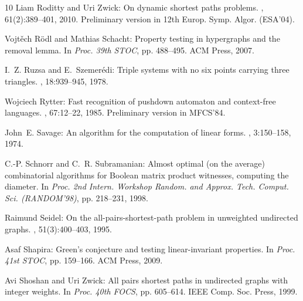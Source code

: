 \begin{thebibliography}{10}
{\sc Liam Roditty and Uri Zwick}: On dynamic shortest paths problems.
, 61(2):389--401, 2010.
\newblock Preliminary version in 12th Europ. Symp. Algor. (ESA'04).
\newblock [\epfmtdoi{10.1007/s00453-010-9401-5}]

{\sc Vojt{\v e}ch R{\"o}dl and Mathias Schacht}: Property testing in
  hypergraphs and the removal lemma.
\newblock In {\em Proc. 39th STOC}, pp. 488--495. ACM Press, 2007.
\newblock [\epfmtdoi{10.1145/1250790.1250862}]

{\sc I.~Z. Ruzsa and E.~Szemer\'{e}di}: Triple systems with no six points
  carrying three triangles.
, 18:939--945,
  1978.

{\sc Wojciech Rytter}: Fast recognition of pushdown automaton and context-free
  languages.
, 67:12--22, 1985.
\newblock Preliminary version in MFCS'84.
\newblock [\epfmtdoi{10.1016/S0019-9958(85)80024-3}]

{\sc John~E. Savage}: An algorithm for the computation of linear forms.
, 3:150--158, 1974.
\newblock [\epfmtdoi{10.1137/0203011}]

{\sc C.-P. Schnorr and C.~R. Subramanian}: Almost optimal (on the average)
  combinatorial algorithms for {B}oolean matrix product witnesses, computing
  the diameter.
\newblock In {\em Proc. 2nd Intern. Workshop Random. and Approx. Tech. Comput.
  Sci. (RANDOM'98)}, pp. 218--231, 1998.
\newblock [\epfmtdoi{10.1007/3-540-49543-6\_18}]

{\sc Raimund Seidel}: On the all-pairs-shortest-path problem in unweighted
  undirected graphs.
, 51(3):400--403, 1995.

{\sc Asaf Shapira}: {G}reen's conjecture and testing linear-invariant
  properties.
\newblock In {\em Proc. 41st STOC}, pp. 159--166. ACM Press, 2009.
\newblock [\epfmtdoi{10.1145/1536414.1536438}]

{\sc Avi Shoshan and Uri Zwick}: All pairs shortest paths in undirected graphs
  with integer weights.
\newblock In {\em Proc. 40th FOCS}, pp. 605--614. IEEE Comp. Soc. Press, 1999.


\end{thebibliography}

